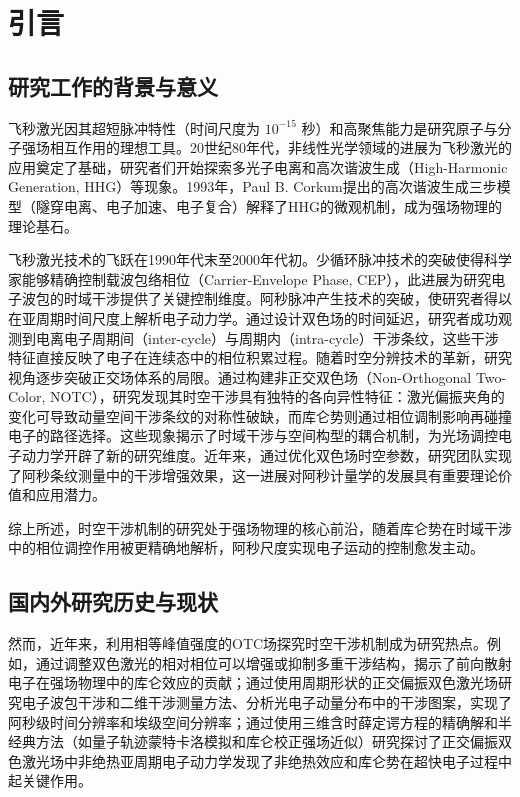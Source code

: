 
\chapter{引\hspace{6pt}言}

\section{研究工作的背景与意义}
飞秒激光因其超短脉冲特性（时间尺度为 $10^{-15}$ 秒）和高聚焦能力是研究原子与分子强场相互作用的理想工具。20世纪80年代，非线性光学领域的进展为飞秒激光的应用奠定了基础，研究者们开始探索多光子电离和高次谐波生成（High-Harmonic Generation, HHG）等现象。1993年，Paul B. Corkum提出的高次谐波生成三步模型（隧穿电离、电子加速、电子复合）解释了HHG的微观机制，成为强场物理的理论基石。

飞秒激光技术的飞跃在1990年代末至2000年代初。少循环脉冲技术的突破使得科学家能够精确控制载波包络相位（Carrier-Envelope Phase, CEP），此进展为研究电子波包的时域干涉提供了关键控制维度。阿秒脉冲产生技术的突破，使研究者得以在亚周期时间尺度上解析电子动力学。通过设计双色场的时间延迟，研究者成功观测到电离电子周期间（inter-cycle）与周期内（intra-cycle）干涉条纹，这些干涉特征直接反映了电子在连续态中的相位积累过程。随着时空分辨技术的革新，研究视角逐步突破正交场体系的局限。通过构建非正交双色场（Non-Orthogonal Two-Color, NOTC），研究发现其时空干涉具有独特的各向异性特征：激光偏振夹角的变化可导致动量空间干涉条纹的对称性破缺，而库仑势则通过相位调制影响再碰撞电子的路径选择。这些现象揭示了时域干涉与空间构型的耦合机制，为光场调控电子动力学开辟了新的研究维度。近年来，通过优化双色场时空参数，研究团队实现了阿秒条纹测量中的干涉增强效果，这一进展对阿秒计量学的发展具有重要理论价值和应用潜力。

综上所述，时空干涉机制的研究处于强场物理的核心前沿，随着库仑势在时域干涉中的相位调控作用被更精确地解析，阿秒尺度实现电子运动的控制愈发主动。

\section{国内外研究历史与现状}
然而，近年来，利用相等峰值强度的OTC场探究时空干涉机制成为研究热点。例如，通过调整双色激光的相对相位可以增强或抑制多重干涉结构，揭示了前向散射电子在强场物理中的库仑效应的贡献；通过使用周期形状的正交偏振双色激光场研究电子波包干涉和二维干涉测量方法、分析光电子动量分布中的干涉图案，实现了阿秒级时间分辨率和埃级空间分辨率；通过使用三维含时薛定谔方程的精确解和半经典方法（如量子轨迹蒙特卡洛模拟和库仑校正强场近似）研究探讨了正交偏振双色激光场中非绝热亚周期电子动力学发现了非绝热效应和库仑势在超快电子过程中起关键作用。

